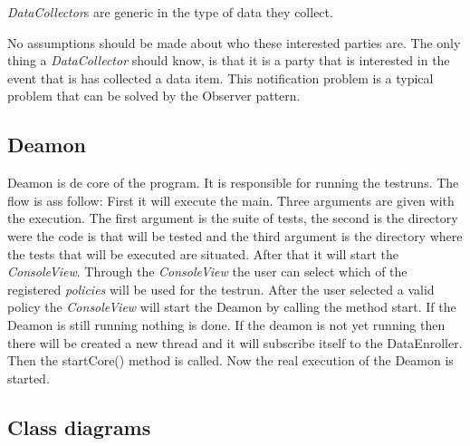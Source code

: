 \documentclass[i2]{oss}
\newcommand{\class}[1]{\emph{#1}}
\begin{document}
\class{DataCollector}s are generic in the type of data they collect.

No assumptions should be made about who these interested parties are. The only thing a \class{DataCollector} should  know, is that it is a party that is interested in the event that is has collected a data item. This notification problem is a typical problem that can be solved by the Observer pattern.




\subsection{Deamon}

Deamon is de core of the program. It is responsible for running the testruns. The flow is ass follow: First it will execute the main. Three arguments are given with the execution. The first argument is the suite of tests, the second is the directory were the code is that will be tested and the third argument is the directory where the tests that will be executed are situated. After that it will start the \class{ConsoleView}. Through the \class{ConsoleView} the user can select which of the registered \emph{policies} will be used for the testrun. After the user selected a valid policy the \class{ConsoleView} will start the Deamon by calling the method start. If the Deamon is still running nothing is done. If the deamon is not yet running then there will be created a new thread and it will subscribe itself to the DataEnroller. 
Then the startCore() method is called. Now the real execution of the Deamon is started.

\subsection{Class diagrams}
\label{ssec:Klassendiagramma}
\end{document}
